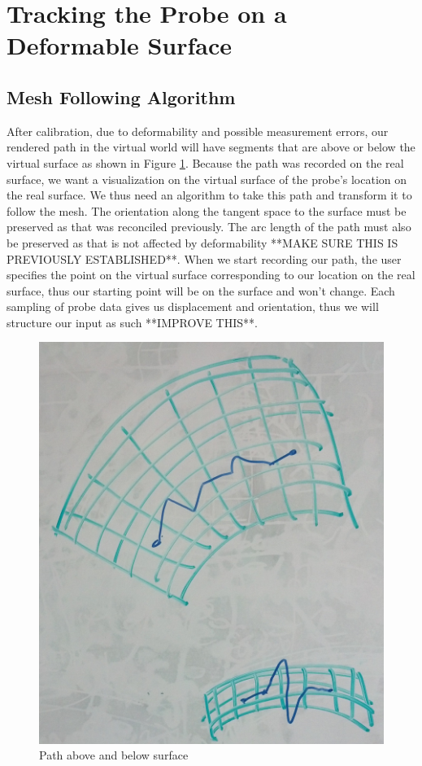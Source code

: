 \section{Tracking the Probe on a Deformable Surface}

\subsection{Mesh Following Algorithm}

After calibration, due to deformability and possible measurement errors, our rendered path in the virtual world will have segments that are above or below the virtual surface as shown in Figure \ref{pathsAboveAndBelow}. Because the path was recorded on the real surface, we want a visualization on the virtual surface of the probe's location on the real surface. We thus need an algorithm to take this path and transform it to follow the mesh. The orientation along the tangent space to the surface must be preserved as that was reconciled previously. The arc length of the path must also be preserved as that is not affected by deformability **MAKE SURE THIS IS PREVIOUSLY ESTABLISHED**. When we start recording our path, the user specifies the point on the virtual surface corresponding to our location on the real surface, thus our starting point will be on the surface and won't change. Each sampling of probe data gives us displacement and orientation, thus we will structure our input as such **IMPROVE THIS**. 

\begin{figure}[ht]
\centering
\includegraphics[width=\columnwidth]{pathaboveandbelow.jpg}
\caption{Path above and below surface}
\label{pathsAboveAndBelow}
\end{figure}

